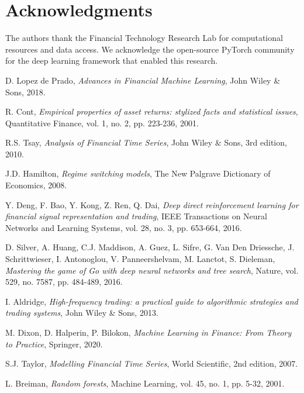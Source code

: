 \documentclass[10pt,twocolumn]{article}
\begin{document}
\section*{Acknowledgments}

The authors thank the Financial Technology Research Lab for computational resources and data access. We acknowledge the open-source PyTorch community for the deep learning framework that enabled this research.

\begin{thebibliography}{35}

D. Lopez de Prado,
\textit{Advances in Financial Machine Learning},
John Wiley \& Sons, 2018.

R. Cont,
\textit{Empirical properties of asset returns: stylized facts and statistical issues},
Quantitative Finance, vol. 1, no. 2, pp. 223-236, 2001.

R.S. Tsay,
\textit{Analysis of Financial Time Series},
John Wiley \& Sons, 3rd edition, 2010.

J.D. Hamilton,
\textit{Regime switching models},
The New Palgrave Dictionary of Economics, 2008.

Y. Deng, F. Bao, Y. Kong, Z. Ren, Q. Dai,
\textit{Deep direct reinforcement learning for financial signal representation and trading},
IEEE Transactions on Neural Networks and Learning Systems, vol. 28, no. 3, pp. 653-664, 2016.

D. Silver, A. Huang, C.J. Maddison, A. Guez, L. Sifre, G. Van Den Driessche, J. Schrittwieser, I. Antonoglou, V. Panneershelvam, M. Lanctot, S. Dieleman,
\textit{Mastering the game of Go with deep neural networks and tree search},
Nature, vol. 529, no. 7587, pp. 484-489, 2016.

I. Aldridge,
\textit{High-frequency trading: a practical guide to algorithmic strategies and trading systems},
John Wiley \& Sons, 2013.

M. Dixon, D. Halperin, P. Bilokon,
\textit{Machine Learning in Finance: From Theory to Practice},
Springer, 2020.

S.J. Taylor,
\textit{Modelling Financial Time Series},
World Scientific, 2nd edition, 2007.

L. Breiman,
\textit{Random forests},
Machine Learning, vol. 45, no. 1, pp. 5-32, 2001.


\end{thebibliography}
\end{document}
